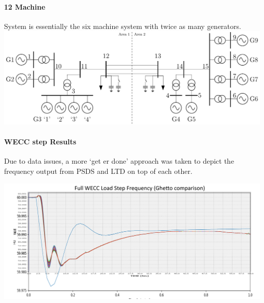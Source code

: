 \documentclass[12pt]{article}
\begin{document}
\begin{multicols}{2}

\vfill\null
\end{multicols}


\pagebreak
\paragraph{12 Machine} System is essentially the six machine system with twice as many generators.\\

\includegraphics[width=\linewidth]{../../models/12machine/12Machine}

\paragraph{WECC step Results} Due to data issues, a more `get er done' approach was taken to depict the frequency output from PSDS and LTD on top of each other.

\includegraphics[width=\linewidth]{figures/weccStep}
\end{document}
